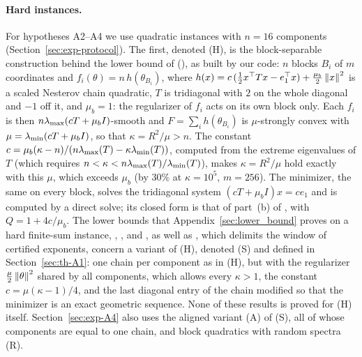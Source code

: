 \paragraph{Hard instances.}
For hypotheses A2--A4 we use quadratic instances with $n=16$ components (Section~\ref{sec:exp-protocol}). The first,
denoted (H), is the block-separable construction behind the lower bound of \cite{lan2018optimal}
(), as built by our code: $n$ blocks $B_i$ of $m$ coordinates and $f_i(\theta) = n\,h(\theta_{B_i})$,
where $h(x) = c\,(\tfrac12 x^\top T x - e_1^\top x) + \tfrac{\mu_b}{2}\left\|x\right\|^2$ is a scaled Nesterov chain quadratic,
$T$ is tridiagonal with $2$ on the whole diagonal and $-1$ off it, and $\mu_b=1$: the regularizer of $f_i$ acts on its
own block only. Each $f_i$ is then $n\lambda_{\max}(cT + \mu_b I)$-smooth and $F=\sum_ih(\theta_{B_i})$ is $\mu$-strongly convex with
$\mu=\lambda_{\min}(cT + \mu_b I)$, so that $\kappa=R^2/\mu>n$. The constant $c=\mu_b(\kappa-n)/(n\lambda_{\max}(T)-\kappa\lambda_{\min}(T))$,
computed from the extreme eigenvalues of $T$ (which requires $n<\kappa<n\lambda_{\max}(T)/\lambda_{\min}(T)$), makes $\kappa=R^2/\mu$
hold exactly with this $\mu$, which exceeds $\mu_b$ (by $30\%$ at $\kappa=10^5$, $m=256$). The minimizer, the same on
every block, solves the tridiagonal system $(cT+\mu_bI)x=ce_1$ and is computed by a direct solve; its closed form is
that of part~(b) of , with $Q=1+4c/\mu_b$. The lower bounds that
Appendix~\ref{sec:lower_bound} proves on a hard finite-sum instance, , ,
 and , as well as , which delimits the window of certified
exponents, concern a variant of (H), denoted (S) and defined in Section~\ref{sec:th-A1}: one chain per component as in
(H), but with the regularizer $\frac\mu2\left\|\theta\right\|^2$ shared by all components, which allows every $\kappa>1$, the
constant $c=\mu(\kappa-1)/4$, and the last diagonal entry of the chain modified so that the minimizer is an exact
geometric sequence. None of these results is proved for (H) itself. Section~\ref{sec:exp-A4} also uses the aligned variant (A) of (S), all of whose
components are equal to one chain, and block quadratics with random spectra (R).
